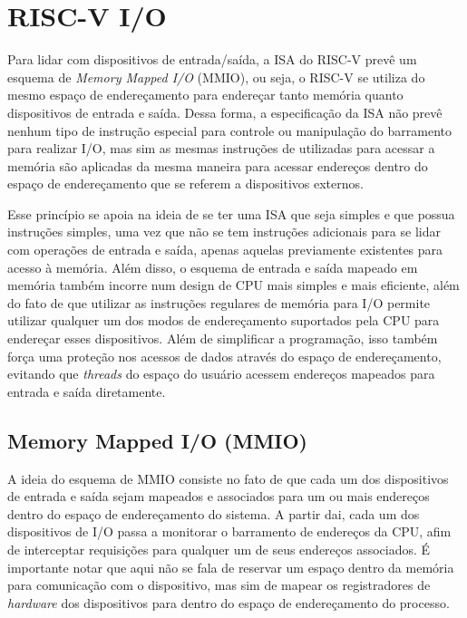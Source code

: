 
\section*{RISC-V I/O}

	Para lidar com dispositivos de entrada/saída, a ISA do RISC-V prevê um esquema de
	\textit{Memory Mapped I/O} (MMIO), ou seja, o RISC-V se utiliza do mesmo espaço de endereçamento
	para endereçar tanto memória quanto dispositivos de entrada e saída. Dessa forma, a
	especificação da ISA não prevê nenhum tipo de instrução especial para controle ou manipulação
	do barramento para realizar I/O, mas sim as mesmas instruções de utilizadas para acessar a
	memória são aplicadas da mesma maneira para acessar endereços dentro do espaço de endereçamento
	que se referem a dispositivos externos.

	Esse princípio se apoia na ideia de se ter uma ISA que seja simples e que possua instruções
	simples, uma vez que não se tem instruções adicionais para se lidar com operações de entrada
	e saída, apenas aquelas previamente existentes para acesso à memória. Além disso, o esquema
	de entrada e saída mapeado em memória também incorre num design de CPU mais simples e mais
	eficiente, além do fato de que utilizar as instruções regulares de memória para I/O permite
	utilizar qualquer um dos modos de endereçamento suportados pela CPU para endereçar
	esses dispositivos. Além de simplificar a programação, isso também força uma proteção nos
	acessos de dados através do espaço de endereçamento, evitando que \textit{threads} do espaço
	do usuário acessem endereços mapeados para entrada e saída diretamente.


	\subsection*{Memory Mapped I/O (MMIO)}
		A ideia do esquema de MMIO consiste no fato de que cada um dos dispositivos de entrada e
		saída sejam mapeados e associados para um ou mais endereços dentro do espaço de endereçamento do
		sistema. A partir dai, cada um dos dispositivos de I/O passa a monitorar o barramento de
		endereços da CPU, afim de interceptar requisições para qualquer um de seus endereços associados.
		É importante notar que aqui não se fala de reservar um espaço dentro da memória para comunicação
		com o dispositivo, mas sim de mapear os registradores de \textit{hardware} dos dispositivos para dentro
		do espaço de endereçamento do processo.

